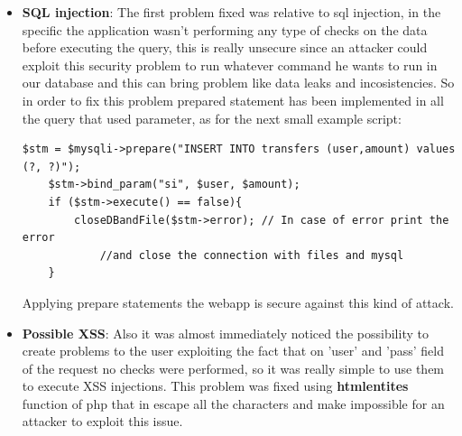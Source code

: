 \documentclass[14pt]{article}
\begin{document}
\begin{itemize}
	\item \textbf{SQL injection}: The first problem fixed was relative to sql injection, in the specific the application wasn't performing any type of checks on the data before executing the query, this is really unsecure since an attacker could exploit this security problem to run whatever command he wants to run in our database and this can bring problem like data leaks and incosistencies. So in order to fix this problem prepared statement has been implemented in all the query that used parameter, as for the next small example script:
	\begin{Verbatim}[tabsize=4]
	$stm = $mysqli->prepare("INSERT INTO transfers (user,amount) values (?, ?)");
	$stm->bind_param("si", $user, $amount);
	if ($stm->execute() == false){
		closeDBandFile($stm->error); // In case of error print the error 
			//and close the connection with files and mysql 
	}
	\end{Verbatim}
	Applying prepare statements the webapp is secure against this kind of attack.
	
	\item \textbf{Possible XSS}: Also it was almost immediately noticed the possibility to create problems to the user exploiting the fact that on 'user' and 'pass' field of the request no checks were performed, so it was really simple to use them to execute XSS injections. This problem was fixed using \textbf{htmlentites} function of php that in escape all the characters and make impossible for an attacker to exploit this issue.
	

\end{itemize}
\end{document}
